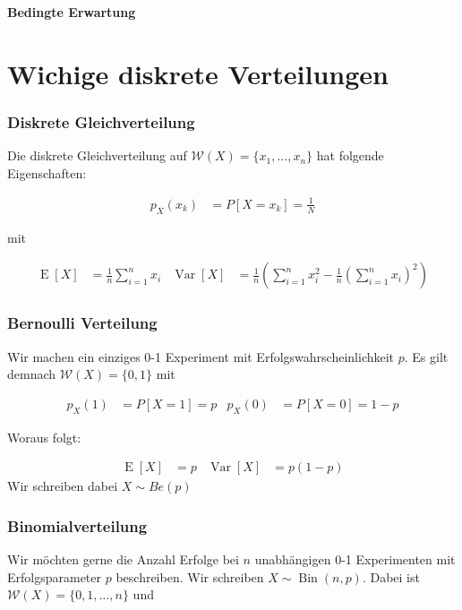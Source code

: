 \documentclass[25pt]{sciposter}
\newcommand{\W}{\mathcal{W}}
\newcommand{\Var}{\operatorname{Var}}
\newcommand{\E}{\operatorname{E}}
\newenvironment{method}[1]{\begin{mdframed}[backgroundcolor=blue!10,innertopmargin=15pt, innerbottommargin=15pt,nobreak=true]
		\textbf{#1 }
	}
	{ 
	\end{mdframed}
}
\begin{document}
\begin{multicols}{3}
\begin{method}{Bedingte Erwartung}
	
\end{method}



\section{Wichige diskrete Verteilungen}

\subsubsection*{Diskrete Gleichverteilung}
Die diskrete Gleichverteilung auf  $\W(X)=\{x_1,\ldots,x_n\}$ hat folgende Eigenschaften:

\begin{align*}
	p_X(x_k) &= P[X = x_k] = \frac{1}{N}
\end{align*}

mit 

\begin{align*}
	\operatorname {E}[X]&={\frac  {1}{n}}\sum _{{i=1}}^{n}x_{i} & \operatorname {Var}[X]&={\frac  {1}{n}}\left(\sum _{{i=1}}^{n}x_{i}^{2}-{\frac  {1}{n}}\left(\sum _{{i=1}}^{n}x_{i}\right)^{2}\right)
\end{align*}

\subsubsection*{Bernoulli Verteilung}
Wir machen ein einziges 0-1 Experiment mit Erfolgswahrscheinlichkeit $p$. Es gilt demnach $\W(X) = \{0,1\}$ mit 

\begin{align*}
	p_X(1) &= P[X=1] = p & 	p_X(0) &= P[X=0] = 1-p
\end{align*}

Woraus folgt:

\begin{align*}
	\E[X] &= p & \Var[X] &= p(1-p)
\end{align*}
Wir schreiben dabei $X\sim {Be}(p)$

\subsubsection*{Binomialverteilung}
Wir möchten gerne die Anzahl Erfolge bei $n$ unabhängigen 0-1 Experimenten mit Erfolgsparameter $p$ beschreiben. Wir schreiben $X \sim \operatorname{Bin}(n,p)$. Dabei ist $\W(X) = \{0,1,\ldots,n\}$ und 


\end{multicols}
\end{document}
